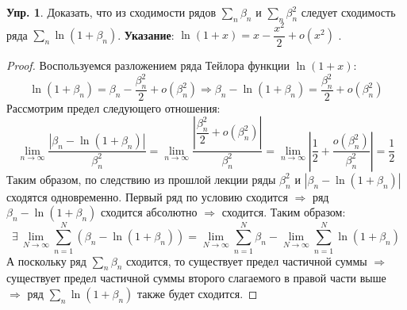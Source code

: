 \documentclass[12pt]{article}
\theoremstyle{definition}
\newtheorem{exrc}{Упр.}
\begin{document}
\begin{exrc}
	Доказать, что из сходимости рядов $\displaystyle \sum\limits_n \beta_n$ и $\displaystyle \sum\limits_n\beta_n^2$ следует сходимость ряда $\displaystyle \sum\limits_n \ln(1 + \beta_n)$. \textbf{Указание}: $\ln(1+ x) = x - \dfrac{x^2}{2} + o(x^2)$ .
\end{exrc}
\begin{proof}
	Воспользуемся разложением ряда Тейлора функции $\ln(1+x)$:
	$$
		\ln(1 + \beta_n) =\beta_n -  \dfrac{\beta_n^2}{2} + o(\beta_n^2) \Rightarrow \beta_n - \ln(1 + \beta_n) = \dfrac{\beta_n^2}{2} + o(\beta_n^2)
	$$
	Рассмотрим предел следующего отношения:
	$$
		\lim\limits_{n \to \infty}\dfrac{\left|\beta_n - \ln(1 + \beta_n)\right|}{\beta_n^2} = \lim\limits_{n \to \infty}\dfrac{\left|\dfrac{\beta_n^2}{2} + o(\beta_n^2)\right|}{\beta_n^2} = \lim\limits_{n \to \infty} \left|\dfrac{1}{2} + \dfrac{o(\beta_n^2)}{\beta_n^2} \right| = \dfrac{1}{2}
	$$
	Таким образом, по следствию из прошлой лекции ряды $\beta_n^2$ и $\left|\beta_n - \ln(1 + \beta_n)\right|$ сходятся одновременно. Первый ряд по условию сходится $\Rightarrow$ ряд $\beta_n - \ln(1 + \beta_n)$ сходится абсолютно $\Rightarrow$ сходится. Таким образом:
	$$
		\exists \, \lim\limits_{N \to \infty} \sum\limits_{n = 1}^{N}(\beta_n - \ln(1 + \beta_n)) = \lim\limits_{N \to \infty} \sum\limits_{n = 1}^{N}\beta_n  - \lim\limits_{N \to \infty} \sum\limits_{n = 1}^{N}\ln(1 + \beta_n)
	$$
	А поскольку ряд $\displaystyle \sum\limits_n \beta_n$ сходится, то существует предел частичной суммы $\Rightarrow$ существует предел частичной суммы второго слагаемого в правой части выше $\Rightarrow$ ряд $\displaystyle \sum\limits_n \ln(1 + \beta_n)$ также будет сходится.
\end{proof}
\end{document}

